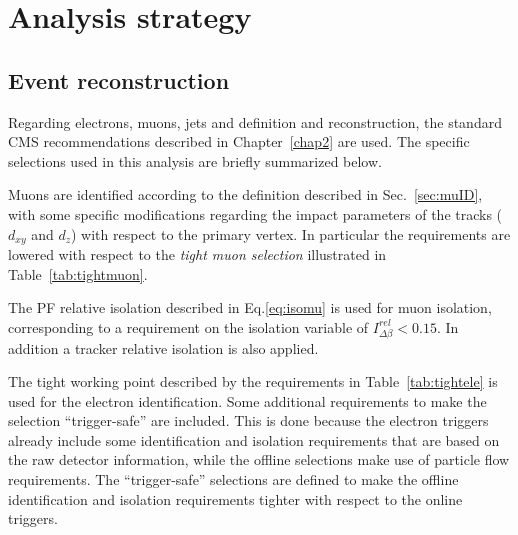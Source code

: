 \section{Analysis strategy}\label{chap5:analysis_strategy}

\subsection{Event reconstruction}

Regarding electrons, muons, jets and \MET definition and reconstruction, the standard CMS recommendations described in Chapter~\ref{chap2} are used. The specific selections used in this analysis are briefly summarized below.

Muons are identified according to the definition described in Sec.~\ref{sec:muID}, with some specific modifications regarding the impact parameters of the tracks ($d_{xy}$ and $d_z$) with respect to the primary vertex. In particular the requirements are lowered with respect to the \emph{tight muon selection} illustrated in Table~\ref{tab:tightmuon}.


The PF relative isolation described in Eq.\eqref{eq:isomu} is used for muon isolation, corresponding to a requirement on the isolation variable of $I^{rel}_{\Delta\beta} < 0.15$. In addition a tracker relative isolation is also applied.

The tight working point described by the requirements in Table~\ref{tab:tightele} is used for the electron identification. Some additional requirements to make the selection ``trigger-safe'' are included. This is done because the electron triggers already include some identification and isolation requirements that are based on the raw detector information, while the offline selections make use of particle flow requirements. The ``trigger-safe'' selections are defined to make the offline identification and isolation requirements tighter with respect to the online triggers.

